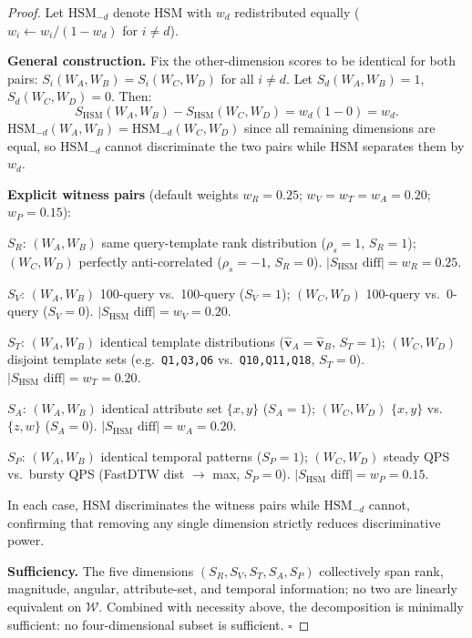 \documentclass[10pt,twocolumn,a4paper]{article}
\newcommand{\SHSM}{S_{\mathrm{HSM}}}
\newcommand{\SR}{S_{R}}
\newcommand{\SV}{S_{V}}
\newcommand{\ST}{S_{T}}
\newcommand{\SA}{S_{A}}
\newcommand{\SPER}{S_{P}}
\begin{document}
\begin{proof}
Let $\mathrm{HSM}_{-d}$ denote $\mathrm{HSM}$ with $w_d$ redistributed
equally ($w_i\leftarrow w_i/(1-w_d)$ for $i\neq d$).

\textbf{General construction.} Fix the other-dimension scores to be
identical for both pairs: $S_i(W_A,W_B)=S_i(W_C,W_D)$ for all $i\neq d$.
Let $S_d(W_A,W_B)=1$, $S_d(W_C,W_D)=0$. Then:
\[
  \SHSM(W_A,W_B)-\SHSM(W_C,W_D)=w_d(1-0)=w_d.
\]
$\mathrm{HSM}_{-d}(W_A,W_B)=\mathrm{HSM}_{-d}(W_C,W_D)$ since all
remaining dimensions are equal, so $\mathrm{HSM}_{-d}$ cannot
discriminate the two pairs while $\mathrm{HSM}$ separates them by
$w_d$.

\textbf{Explicit witness pairs} (default weights $w_R=0.25$;
$w_V=w_T=w_A=0.20$; $w_P=0.15$):

\smallskip
\noindent$\SR$: $(W_A,W_B)$ same query-template rank distribution
($\rho_s=1$, $\SR=1$); $(W_C,W_D)$ perfectly anti-correlated
($\rho_s=-1$, $\SR=0$). $|\SHSM\text{ diff}|=w_R=0.25$.\;\checkmark

\smallskip
\noindent$\SV$: $(W_A,W_B)$ 100-query vs.\ 100-query ($\SV=1$);
$(W_C,W_D)$ 100-query vs.\ 0-query ($\SV=0$).
$|\SHSM\text{ diff}|=w_V=0.20$.\;\checkmark

\smallskip
\noindent$\ST$: $(W_A,W_B)$ identical template distributions
($\hat{\mathbf{v}}_A=\hat{\mathbf{v}}_B$, $\ST=1$); $(W_C,W_D)$
disjoint template sets (e.g.\ \texttt{Q1,Q3,Q6} vs.\
\texttt{Q10,Q11,Q18}, $\ST=0$).
$|\SHSM\text{ diff}|=w_T=0.20$.\;\checkmark

\smallskip
\noindent$\SA$: $(W_A,W_B)$ identical attribute set $\{x,y\}$
($\SA=1$); $(W_C,W_D)$ $\{x,y\}$ vs.\ $\{z,w\}$ ($\SA=0$).
$|\SHSM\text{ diff}|=w_A=0.20$.\;\checkmark

\smallskip
\noindent$\SPER$: $(W_A,W_B)$ identical temporal patterns
($\SPER=1$); $(W_C,W_D)$ steady QPS vs.\ bursty QPS
(FastDTW dist $\to$ max, $\SPER=0$).
$|\SHSM\text{ diff}|=w_P=0.15$.\;\checkmark

In each case, $\mathrm{HSM}$ discriminates the witness pairs while
$\mathrm{HSM}_{-d}$ cannot, confirming that removing any single
dimension strictly reduces discriminative power.

\textbf{Sufficiency.} The five dimensions $(\SR,\SV,\ST,\SA,\SPER)$
collectively span rank, magnitude, angular, attribute-set, and
temporal information; no two are linearly equivalent on
$\mathcal{W}$. Combined with necessity above, the decomposition is
minimally sufficient: no four-dimensional subset is sufficient.
\hfill$\square$
\end{proof}
\end{document}
